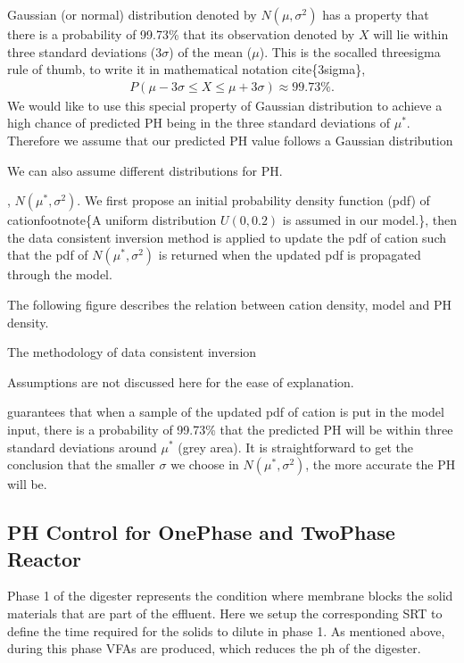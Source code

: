 \documentclass[a4paper,10pt,english]{sphinxmanual}
\let\sphinxpxdimen\pdfpxdimen\else\newdimen\sphinxpxdimen
\begin{document}
\sphinxAtStartPar
Gaussian (or normal) distribution denoted by \(N(\mu, \sigma^2)\) has a property that
there is a probability of 99.73\% that its observation denoted by \(X\) will lie within three standard deviations (\(3\sigma\)) of the mean (\(\mu\)). This is the so\sphinxhyphen{}called three\sphinxhyphen{}sigma rule of thumb, to write it in mathematical notation cite\{3sigma\},
\begin{equation*}
\begin{split}P(\mu-3\sigma \leq X \leq \mu+3\sigma) \approx 99.73\%.\end{split}
\end{equation*}
\sphinxAtStartPar
We would like to use this special property of Gaussian distribution to achieve a high chance of predicted PH being in the three standard deviations of \(\mu^*\). Therefore we assume that our predicted PH value follows a Gaussian distribution %
\begin{footnote}[2]\sphinxAtStartFootnote
We can also assume different distributions for PH.
%
\end{footnote}, \(N(\mu^*, \sigma^2)\). We first propose an initial probability  density function (pdf) of cationfootnote\{A uniform distribution \(U(0,0.2)\) is assumed in our model.\}, then the data consistent inversion method is applied to update the pdf  of cation such that the pdf of \(N(\mu^*, \sigma^2)\) is returned when the updated pdf is propagated through the model.

\sphinxAtStartPar
The following figure describes the relation between cation density, model and PH density.

\noindent\sphinxincludegraphics[width=1050\sphinxpxdimen,height=375\sphinxpxdimen]{{pdftonormal}.png}

\sphinxAtStartPar
The methodology of data consistent inversion %
\begin{footnote}[3]\sphinxAtStartFootnote
Assumptions are not discussed here for the ease of explanation.
%
\end{footnote} guarantees that when a sample of the updated pdf of cation is put in the model input, there is a probability of 99.73\% that the predicted PH will be within three standard deviations around \(\mu^*\) (grey area). It is straightforward to get the conclusion  that the smaller \(\sigma\) we choose in \(N(\mu^*, \sigma^2)\), the more accurate the PH will be.


\subsection{PH Control for One\sphinxhyphen{}Phase and Two\sphinxhyphen{}Phase Reactor}
\label{\detokenize{ph12:ph-control-for-one-phase-and-two-phase-reactor}}\label{\detokenize{ph12::doc}}
\sphinxAtStartPar
Phase 1 of the digester represents the condition where membrane blocks the solid materials that are part of the effluent. Here we setup the corresponding SRT to define the time required for the solids to dilute in phase 1. As mentioned above, during this phase VFAs are produced, which reduces the ph of the digester.
\end{document}
